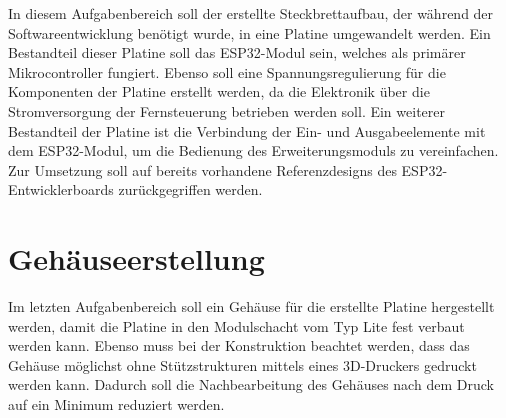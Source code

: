 In diesem Aufgabenbereich soll der erstellte Steckbrettaufbau, der während der Softwareentwicklung benötigt wurde, in eine Platine umgewandelt werden. Ein Bestandteil dieser Platine soll das ESP32-Modul sein, welches als primärer Mikrocontroller fungiert. Ebenso soll eine Spannungsregulierung für die Komponenten der Platine erstellt werden, da die Elektronik über die Stromversorgung der Fernsteuerung betrieben werden soll. Ein weiterer Bestandteil der Platine ist die Verbindung der Ein- und Ausgabeelemente mit dem ESP32-Modul, um die Bedienung des Erweiterungsmoduls zu vereinfachen. Zur Umsetzung soll auf bereits vorhandene Referenzdesigns des ESP32-Entwicklerboards zurückgegriffen werden.

\section{Gehäuseerstellung}

Im letzten Aufgabenbereich soll ein Gehäuse für die erstellte Platine hergestellt werden, damit die Platine in den Modulschacht vom Typ Lite fest verbaut werden kann. Ebenso muss bei der Konstruktion beachtet werden, dass das Gehäuse möglichst ohne Stützstrukturen mittels eines 3D-Druckers gedruckt werden kann. Dadurch soll die Nachbearbeitung des Gehäuses nach dem Druck auf ein Minimum reduziert werden.